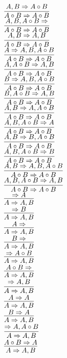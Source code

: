 \documentclass[11pt]{article}
\begin{document}
\begin{center}
\\$\infer{A\circ B\Rightarrow A\circ B}{A, B\Rightarrow A\circ B}$
\bigskip
\\$\infer{A\circ B\Rightarrow A\circ B}{A, B, A\circ B\Rightarrow }$
\bigskip
\\$\infer{A\circ B\Rightarrow A\circ B}{A, B\Rightarrow A, B}$
\bigskip
\\$\infer{A\circ B\Rightarrow A\circ B}{A\Rightarrow A, B, A\circ B}$
\bigskip
\\$\infer{A\circ B\Rightarrow A\circ B}{A, A\circ B\Rightarrow A, B}$
\bigskip
\\$\infer{A\circ B\Rightarrow A\circ B}{B\Rightarrow A, B, A\circ B}$
\bigskip
\\$\infer{A\circ B\Rightarrow A\circ B}{B, A\circ B\Rightarrow A, B}$
\bigskip
\\$\infer{A\circ B\Rightarrow A\circ B}{A, B\Rightarrow A, A\circ B}$
\bigskip
\\$\infer{A\circ B\Rightarrow A\circ B}{A, B, A\circ B\Rightarrow A}$
\bigskip
\\$\infer{A\circ B\Rightarrow A\circ B}{A, B\Rightarrow B, A\circ B}$
\bigskip
\\$\infer{A\circ B\Rightarrow A\circ B}{A, B, A\circ B\Rightarrow B}$
\bigskip
\\$\infer{A\circ B\Rightarrow A\circ B}{A, B\Rightarrow A, B, A\circ B}$
\bigskip
\\$\infer{A\circ B\Rightarrow A\circ B}{A, B, A\circ B\Rightarrow A, B}$
\bigskip
\\$\infer{A\Rightarrow A, B}{\Rightarrow A}$
\bigskip
\\$\infer{A\Rightarrow A, B}{\Rightarrow B}$
\bigskip
\\$\infer{A\Rightarrow A, B}{A\Rightarrow }$
\bigskip
\\$\infer{A\Rightarrow A, B}{B\Rightarrow }$
\bigskip
\\$\infer{A\Rightarrow A, B}{\Rightarrow A\circ B}$
\bigskip
\\$\infer{A\Rightarrow A, B}{A\circ B\Rightarrow }$
\bigskip
\\$\infer{A\Rightarrow A, B}{\Rightarrow A, B}$
\bigskip
\\$\infer{A\Rightarrow A, B}{A\Rightarrow A}$
\bigskip
\\$\infer{A\Rightarrow A, B}{B\Rightarrow A}$
\bigskip
\\$\infer{A\Rightarrow A, B}{\Rightarrow A, A\circ B}$
\bigskip
\\$\infer{A\Rightarrow A, B}{A\circ B\Rightarrow A}$

\end{center}
\end{document}

